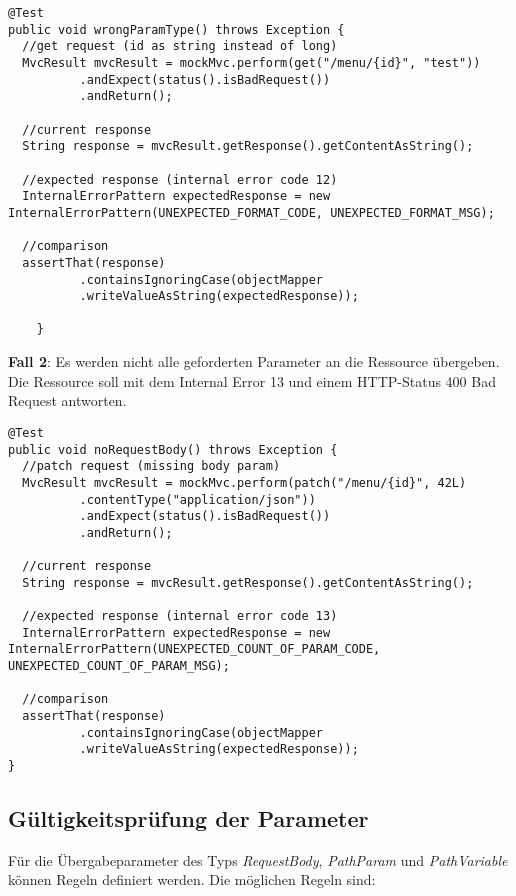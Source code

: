\begin{lstlisting}[caption={Falscher Typ Test}, commentstyle=\color{green},]
@Test
public void wrongParamType() throws Exception {
  //get request (id as string instead of long)
  MvcResult mvcResult = mockMvc.perform(get("/menu/{id}", "test"))
          .andExpect(status().isBadRequest())
          .andReturn();

  //current response
  String response = mvcResult.getResponse().getContentAsString();

  //expected response (internal error code 12)
  InternalErrorPattern expectedResponse = new InternalErrorPattern(UNEXPECTED_FORMAT_CODE, UNEXPECTED_FORMAT_MSG);

  //comparison
  assertThat(response)
          .containsIgnoringCase(objectMapper
          .writeValueAsString(expectedResponse));

    }
\end{lstlisting}

\textbf{Fall 2}: Es werden nicht alle geforderten Parameter an die Ressource übergeben. Die Ressource soll mit dem Internal Error 13 und einem \ac{HTTP}-Status 400 Bad Request antworten.

\begin{lstlisting}[caption={Fehlende Parameter Test}, commentstyle=\color{green},]
@Test
public void noRequestBody() throws Exception {
  //patch request (missing body param)
  MvcResult mvcResult = mockMvc.perform(patch("/menu/{id}", 42L)
          .contentType("application/json"))
          .andExpect(status().isBadRequest())
          .andReturn();

  //current response
  String response = mvcResult.getResponse().getContentAsString();

  //expected response (internal error code 13)
  InternalErrorPattern expectedResponse = new InternalErrorPattern(UNEXPECTED_COUNT_OF_PARAM_CODE, UNEXPECTED_COUNT_OF_PARAM_MSG);

  //comparison
  assertThat(response)
          .containsIgnoringCase(objectMapper
          .writeValueAsString(expectedResponse));
}
\end{lstlisting}

\subsection*{Gültigkeitsprüfung der Parameter}

Für die Übergabeparameter des Typs \textit{RequestBody}, \textit{PathParam} und \textit{PathVariable} können Regeln definiert werden. Die möglichen Regeln sind:

